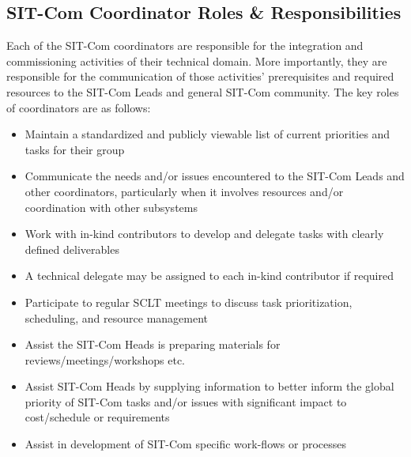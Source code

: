 \documentclass[SE,lsstdraft,authoryear,toc]{lsstdoc}
\begin{document}
\subsection{SIT-Com Coordinator Roles \& Responsibilities}
\label{sec:coordinator_r_and_rs}
Each of the SIT-Com coordinators are responsible for the integration and commissioning activities of their technical domain.
More importantly, they are responsible for the communication of those activities' prerequisites and required resources to the SIT-Com Leads and general SIT-Com community.
The key roles of coordinators are as follows:
\begin{itemize}
    \item Maintain a standardized and publicly viewable list of current priorities and tasks for their group
    \item Communicate the needs and/or issues encountered to the SIT-Com Leads and other coordinators, particularly when it involves resources and/or coordination with other subsystems
    \item Work with in-kind contributors to develop and delegate tasks with clearly defined deliverables
    \item A technical delegate may be assigned to each in-kind contributor if required
    \item Participate to regular SCLT meetings to discuss task prioritization, scheduling, and resource management
    \item Assist the SIT-Com Heads is preparing materials for reviews/meetings/workshops etc.
    \item Assist SIT-Com Heads by supplying information to better inform the global priority of SIT-Com tasks and/or issues with significant impact to cost/schedule or requirements
    \item Assist in development of SIT-Com specific work-flows or processes
\end{itemize}
\end{document}
